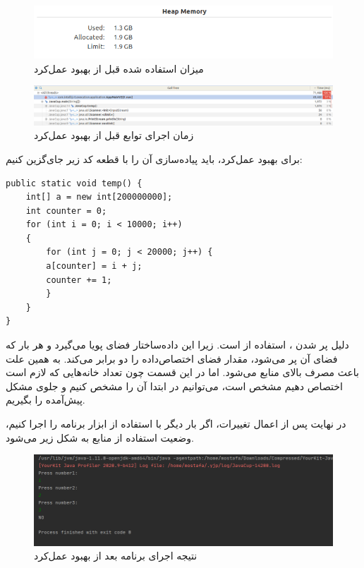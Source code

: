 \begin{figure}[!hbpt]
	\centering
	\includegraphics[scale=0.5]{./img/before/4.png}
	\caption{میزان  استفاده شده قبل از بهبود عمل‌کرد}
\end{figure}




\begin{figure}[!hbpt]
	\centering
	\includegraphics[width=\linewidth]{./img/before/5.png}
	\caption{زمان اجرای توابع قبل از بهبود عمل‌کرد}
\end{figure}

\newpage

 
برای بهبود عمل‌کرد، باید پیاده‌سازی آن را با قطعه کد زیر جای‌گزین کنیم:

\begin{Verbatim}[tabsize=4]
public static void temp() {
	int[] a = new int[200000000];
	int counter = 0;
	for (int i = 0; i < 10000; i++)
	{
		for (int j = 0; j < 20000; j++) {
		a[counter] = i + j;
		counter += 1;
		}
	}
}
\end{Verbatim}

دلیل پر شدن ، استفاده از  است. زیرا این داده‌ساختار فضای پویا می‌گیرد و هر بار که فضای آن پر می‌شود، مقدار فضای اختصاص‌داده را دو برابر می‌کند. به همین علت باعث مصرف بالای منابع می‌شود.
اما در این قسمت چون تعداد خانه‌هایی که لازم است اختصاص دهیم مشخص است، می‌توانیم در ابتدا آن را مشخص کنیم و جلوی مشکل پیش‌آمده را بگیریم.

در نهایت پس از اعمال تغییرات، اگر بار دیگر با استفاده از ابزار  برنامه را اجرا کنیم، وضعیت استفاده از منابع به شکل زیر می‌شود.

\begin{figure}[!hbpt]
	\centering
	\includegraphics[scale=0.4]{./img/after/2.png}
	\caption{نتیجه اجرای برنامه بعد از بهبود عمل‌کرد}
\end{figure}

